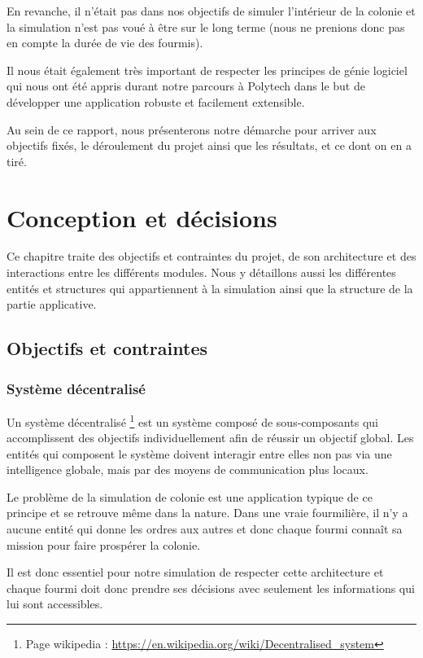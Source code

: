 \documentclass{EPUProjetDi}
\begin{document}
En revanche, il n'était pas dans nos objectifs de simuler l'intérieur de la colonie et la simulation n'est pas voué à être sur le long terme
(nous ne prenions donc pas en compte la durée de vie des fourmis).

Il nous était également très important de respecter les principes de génie logiciel qui nous ont été appris durant notre
parcours à Polytech dans le but de développer une application robuste et facilement extensible.

Au sein de ce rapport, nous présenterons notre démarche pour arriver aux objectifs fixés, le déroulement du projet ainsi que les résultats, 
et ce dont on en a tiré.

\chapter{Conception et décisions}

Ce chapitre traite des objectifs et contraintes du projet, de son architecture et des interactions entre les différents modules. 
Nous y détaillons aussi les différentes entités et structures qui appartiennent à la simulation ainsi que la structure de la partie applicative.

\section{Objectifs et contraintes}

\subsection*{Système décentralisé}

Un système décentralisé \footnote[1]{Page wikipedia : \url{https://en.wikipedia.org/wiki/Decentralised_system}} est un système composé de sous-composants qui accomplissent des objectifs individuellement afin
de réussir un objectif global.
Les entités qui composent le système doivent interagir entre elles non pas via une intelligence globale, mais par des moyens de communication plus locaux.

Le problème de la simulation de colonie est une application typique de ce principe et se retrouve même dans la nature.
Dans une vraie fourmilière, il n'y a aucune entité qui donne les ordres aux autres et donc chaque fourmi connaît sa mission
pour faire prospérer la colonie. 

Il est donc essentiel pour notre simulation de respecter cette architecture et chaque fourmi doit donc prendre ses décisions
avec seulement les informations qui lui sont accessibles.
\end{document}
